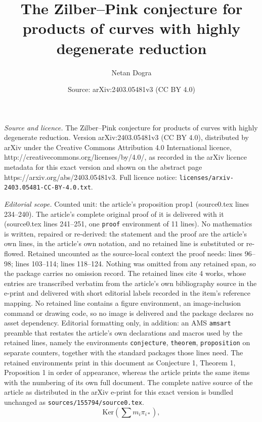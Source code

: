 \documentclass[10pt,a4paper]{amsart}
\title{The Zilber--Pink conjecture for products of curves with highly degenerate reduction}
\author{Netan Dogra}
\date{Source: arXiv:2403.05481v3 (CC BY 4.0)}
\newcommand{\Ker}{\mathrm{Ker}}
\begin{document}
\maketitle

\noindent\emph{Source and licence.} The Zilber--Pink conjecture for products of curves with highly degenerate reduction. Version arXiv:2403.05481v3 (CC BY 4.0), distributed by arXiv under the Creative Commons Attribution 4.0 International licence, http://creativecommons.org/licenses/by/4.0/, as recorded in the arXiv licence metadata for this exact version and shown on the abstract page https://arxiv.org/abs/2403.05481v3. Full licence notice: \texttt{licenses/arxiv-2403.05481-CC-BY-4.0.txt}.\par\smallskip

\noindent\textit{Editorial scope.} Counted unit: the article's proposition prop1 (source0.tex lines 234--240). The article's complete original proof of it is delivered with it (source0.tex lines 241--251, one \texttt{proof} environment of 11 lines). No mathematics is written, repaired or re-derived: the statement and the proof are the article's own lines, in the article's own notation, and no retained line is substituted or re-flowed.  Retained uncounted as the source-local context the proof needs: lines 96--98; lines 103--114; lines 118--124.  Nothing was omitted from any retained span, so the package carries no omission record.  The retained lines cite 4 works, whose entries are transcribed verbatim from the article's own bibliography source in the e-print and delivered with short editorial labels recorded in the item's reference mapping.  No retained line contains a figure environment, an image-inclusion command or drawing code, so no image is delivered and the package declares no asset dependency.  Editorial formatting only, in addition: an AMS \texttt{amsart} preamble that restates the article's own declarations and macros used by the retained lines, namely the environments \texttt{conjecture}, \texttt{theorem}, \texttt{proposition} on separate counters, together with the standard packages those lines need.  The retained environments print in this document as Conjecture 1, Theorem 1, Proposition 1 in order of appearance, whereas the article prints the same items with the numbering of its own full document.  The complete native source of the article as distributed in the arXiv e-print for this exact version is bundled unchanged as \texttt{sources/155794/source0.tex}.
\begin{equation}\label{eqn:ker}
\Ker (\sum m_i \pi _{i *}),
\end{equation}
\end{document}
